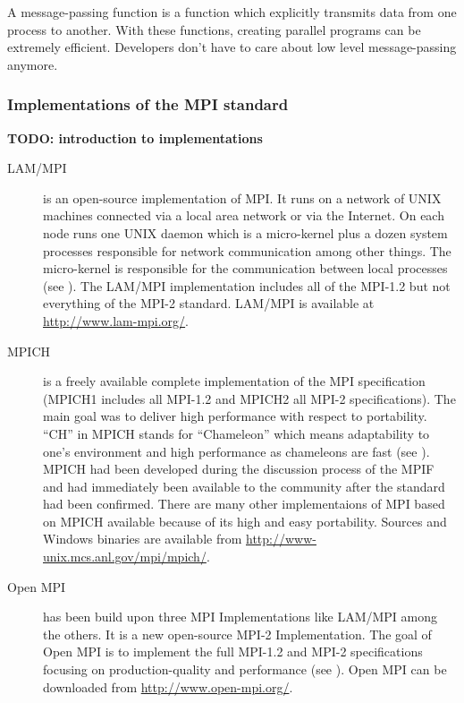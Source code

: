A message-passing function is a function which explicitly transmits
data from one process to another. With these
functions, creating parallel programs can be extremely
efficient. Developers don't have to care about low level
message-passing anymore.

\subsubsection{Implementations of the MPI standard}

\textbf{TODO: introduction to implementations}

\begin{description}
\item[LAM/MPI] is an open-source implementation of MPI. It runs on a
  network of UNIX machines connected via a local area network or via
  the Internet. On each node runs one UNIX daemon which is a
  micro-kernel plus a dozen system processes responsible for network
  communication among other things. The micro-kernel is
  responsible for the communication between local processes (see
  \cite{burns94lam}). The LAM/MPI implementation includes all of the
  MPI-1.2 but not everything of the MPI-2 standard. LAM/MPI is
  available at \url{http://www.lam-mpi.org/}.
\item[MPICH] is a freely available complete implementation of the MPI
  specification (MPICH1 includes all MPI-1.2 and MPICH2 all MPI-2
  specifications). The main goal was to deliver high performance with
  respect to portability. ``CH'' in MPICH stands for ``Chameleon''
  which means adaptability to one's environment and high performance
  as chameleons are fast (see \cite{gropp96mpich}). MPICH had been
  developed during the discussion process of the MPIF and had immediately been
  available to the community after the standard had been
  confirmed. There are many other implementaions of MPI based on MPICH
  available because of its high and easy portability. Sources and
  Windows binaries are available from
  \url{http://www-unix.mcs.anl.gov/mpi/mpich/}.
\item[Open MPI] has been build upon three MPI Implementations like
  LAM/MPI among the others. It is a new open-source MPI-2
  Implementation. The goal of Open MPI is to implement the full
  MPI-1.2 and MPI-2 specifications focusing on production-quality and
  performance (see \cite{gabriel04:_open_mpi}). Open MPI can be
  downloaded from  \url{http://www.open-mpi.org/}.
\end{description}

